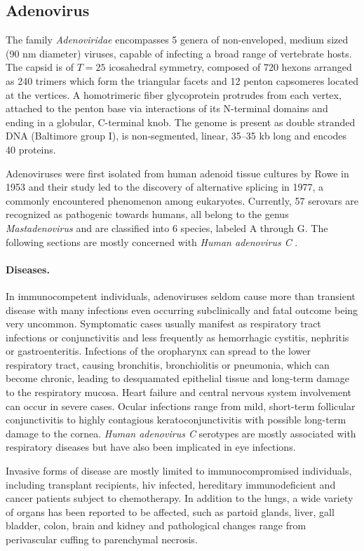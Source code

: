 \subsection{Adenovirus}
The family \textit{Adenoviridae} encompasses 5 genera of non-enveloped, medium sized (90 nm diameter) viruses, capable of infecting a broad range of vertebrate hosts. The capsid is of $T=25$ icosahedral symmetry, composed of 720 hexons arranged as 240 trimers which form the triangular facets and 12 penton capsomeres located at the vertices. A homotrimeric fiber glycoprotein protrudes from each vertex, attached to the penton base via interactions of its N-terminal domains and ending in a globular, C-terminal knob. The genome is present as double stranded DNA (Baltimore group I), is non-segmented, linear, 35--35 kb long and encodes 40 proteins.

Adenoviruses were first isolated from human adenoid tissue cultures by Rowe in 1953 and their study led to the discovery of alternative splicing in 1977, a commonly encountered phenomenon among eukaryotes. Currently, 57 serovars are recognized as pathogenic towards humans, all belong to the genus \textit{Mastadenovirus} and are classified into 6 species, labeled A through G. The following sections are mostly concerned with \textit{Human adenovirus C} \citep{Lenaerts2008}.

\paragraph{Diseases.}
In immunocompetent individuals, adenoviruses seldom cause more than transient disease with many infections even occurring subclinically and fatal outcome being very uncommon. Symptomatic cases usually manifest as respiratory tract infections or conjunctivitis and less frequently as hemorrhagic cystitis, nephritis or gastroenteritis. Infections of the oropharynx can spread to the lower respiratory tract, causing bronchitis, bronchiolitis or pneumonia, which can become chronic, leading to desquamated epithelial tissue and long-term damage to the respiratory mucosa. Heart failure and central nervous system involvement can occur in severe cases. Ocular infections range from mild, short-term follicular conjunctivitis to highly contagious keratoconjunctivitis with possible long-term damage to the cornea. \textit{Human adenovirus C} serotypes are mostly associated with respiratory diseases but have also been implicated in eye infections.

Invasive forms of disease are mostly limited to immunocompromised individuals, including transplant recipients, \gls{hiv} infected, hereditary immunodeficient and cancer patients subject to chemotherapy. In addition to the lungs, a wide variety of organs has been reported to be affected, such as partoid glands, liver, gall bladder, colon, brain and kidney and pathological changes range from perivascular cuffing to parenchymal necrosis.

